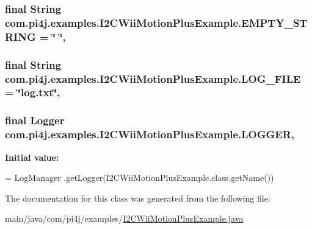 \subsubsection[{E\+M\+P\+T\+Y\+\_\+\+S\+T\+R\+I\+N\+G}]{\setlength{\rightskip}{0pt plus 5cm}final String com.\+pi4j.\+examples.\+I2\+C\+Wii\+Motion\+Plus\+Example.\+E\+M\+P\+T\+Y\+\_\+\+S\+T\+R\+I\+N\+G = \char`\"{} \char`\"{}\hspace{0.3cm}{\ttfamily [static]}, {\ttfamily [private]}}\label{classcom_1_1pi4j_1_1examples_1_1I2CWiiMotionPlusExample_a6ec0a220e417a66f10e90138b00f93ab}
\hypertarget{classcom_1_1pi4j_1_1examples_1_1I2CWiiMotionPlusExample_a79cb6b5d2e13a7d078a04935985de532}{}
\subsubsection[{L\+O\+G\+\_\+\+F\+I\+L\+E}]{\setlength{\rightskip}{0pt plus 5cm}final String com.\+pi4j.\+examples.\+I2\+C\+Wii\+Motion\+Plus\+Example.\+L\+O\+G\+\_\+\+F\+I\+L\+E = \char`\"{}log.\+txt\char`\"{}\hspace{0.3cm}{\ttfamily [static]}, {\ttfamily [private]}}\label{classcom_1_1pi4j_1_1examples_1_1I2CWiiMotionPlusExample_a79cb6b5d2e13a7d078a04935985de532}
\hypertarget{classcom_1_1pi4j_1_1examples_1_1I2CWiiMotionPlusExample_a8cc3c8ff3d397904bd9e6dd8a82644d7}{}
\subsubsection[{L\+O\+G\+G\+E\+R}]{\setlength{\rightskip}{0pt plus 5cm}final Logger com.\+pi4j.\+examples.\+I2\+C\+Wii\+Motion\+Plus\+Example.\+L\+O\+G\+G\+E\+R\hspace{0.3cm}{\ttfamily [static]}, {\ttfamily [private]}}\label{classcom_1_1pi4j_1_1examples_1_1I2CWiiMotionPlusExample_a8cc3c8ff3d397904bd9e6dd8a82644d7}
{\bfseries Initial value\+:}
\begin{DoxyCode}
= LogManager
            .getLogger(I2CWiiMotionPlusExample.class.getName())
\end{DoxyCode}


The documentation for this class was generated from the following file\+:\begin{DoxyCompactItemize}
\item 
main/java/com/pi4j/examples/\hyperlink{I2CWiiMotionPlusExample_8java}{I2\+C\+Wii\+Motion\+Plus\+Example.\+java}\end{DoxyCompactItemize}
